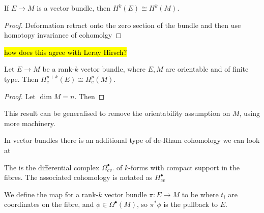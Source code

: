 \documentclass{article}
\begin{document}
\begin{prop}
	If $E\to M$ is a vector bundle, then $	H^k(E) \cong H^k(M)$.
\end{prop}
\begin{proof}
	Deformation retract onto the zero section of the bundle and then use homotopy invariance of cohomolgy
\end{proof}

\begin{remark}
	\hl{how does this agree with Leray Hirsch?}
\end{remark}

\begin{prop}
	Let $E \to M$ be a rank-$k$ vector bundle, where $E,M$ are orientable and of finite type. Then $H_c^{p+k}(E) \cong H^{p}_c(M)$. 
\end{prop}
\begin{proof}
	Let $\dim M = n$. Then 
\end{proof}

\begin{remark}
	This result can be generalised to remove the orientability assumption on $M$, using more machinery. 
\end{remark}

In vector bundles there is an additional type of de-Rham cohomology we can look at 

\begin{definition}
	The  is the differential complex $\Omega_{cv}^\bullet$. of $k$-forms with compact support in the fibres. The associated cohomology is notated as $H^\bullet_{cv}$
\end{definition}

\begin{definition}
We define the  map for a rank-$k$ vector bundle $\pi: E \to M$ to be 
where $t_i$ are coordinates on the fibre, and $\phi \in \Omega^\bullet(M)$, so $\pi^\ast \phi$ is the pullback to $E$. 
\end{definition}
\end{document}
